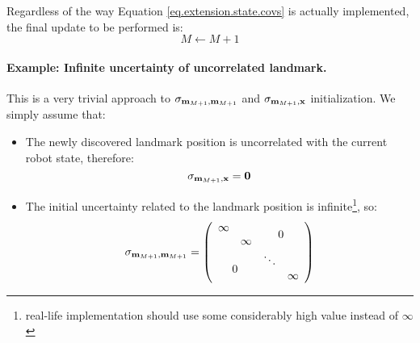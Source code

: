 	\begin{important}
		Regardless of the way Equation \ref{eq.extension.state.covs} is actually implemented, the final update to be performed is:
		\begin{equation}
			M \leftarrow M + 1
		\end{equation}
	\end{important}
	
	\paragraph{Example: Infinite uncertainty of uncorrelated landmark.}
		This is a very trivial approach to $\sigma_{\boldsymbol{\mathrm{{m}}}_{M+1},\boldsymbol{\mathrm{{m}}}_{M+1}}$ and $\sigma_{\boldsymbol{\mathrm{{m}}}_{M+1},\boldsymbol{\mathrm{{x}}}}$ initialization.
		We simply assume that:
		\begin{itemize}
			\item The newly discovered landmark position is uncorrelated with the current robot state, therefore: 
				\[
					\sigma_{\boldsymbol{\mathrm{{m}}}_{M+1},\boldsymbol{\mathrm{{x}}}} = \boldsymbol{\mathrm{{0}}}
				\]
			\item The initial uncertainty related to the landmark position is infinite\footnote{real-life implementation should use some considerably high value instead of $\infty$}, so:
				\[
					\sigma_{\vect{m}_{M+1},\vect{m}_{M+1}} = 
					\left(\begin{array}{cccc}
						\infty & & \multicolumn{2}{c}{\multirow{2}{*}{$0$}}\\
						& \infty & & \\
						\multicolumn{2}{c}{\multirow{2}{*}{$0$}} & \ddots & \\
						& & & \infty 
					\end{array}\right)
				\]
		\end{itemize}
		
